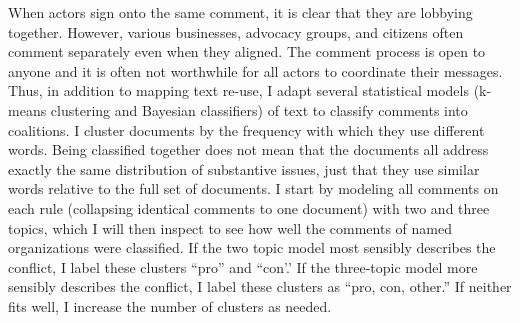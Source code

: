 When actors sign onto the same comment, it is clear that they are lobbying together. %
However, various businesses, advocacy groups, and citizens often comment separately even when they aligned. The comment process is open to anyone and it is often not worthwhile for all actors to coordinate their messages. 
Thus, in addition to mapping text re-use, I adapt several statistical models (k-means clustering and Bayesian classifiers) of text to classify comments into coalitions. %
I cluster documents by the frequency with which they use different words. Being classified together does not mean that the documents all address exactly the same distribution of substantive issues, just that they use similar words relative to the full set of documents.
I start by modeling all comments on each rule (collapsing identical comments to one document) with two and three topics, which I will then inspect to see how well the comments of named organizations were classified. If the two topic model most sensibly describes the conflict, I label these clusters ``pro'' and ``con'.' If the three-topic model more sensibly describes the conflict, I label these clusters as ``pro, con, other.'' If neither fits well, I increase the number of clusters as needed. %




